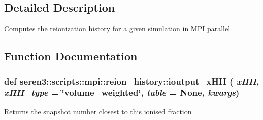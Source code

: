 \subsection{Detailed Description}
\begin{DoxyVerb}
Computes the reionization history for a given simulation in MPI parallel
\end{DoxyVerb}
 

\subsection{Function Documentation}
\hypertarget{namespaceseren3_1_1scripts_1_1mpi_1_1reion__history_a681fd00960f746e906387cdb244f30ac}{
\subsubsection[{ioutput\_\-xHII}]{\setlength{\rightskip}{0pt plus 5cm}def seren3::scripts::mpi::reion\_\-history::ioutput\_\-xHII ( {\em xHII}, \/   {\em xHII\_\-type} = {\ttfamily \char`\"{}volume\_\-weighted\char`\"{}}, \/   {\em table} = {\ttfamily None}, \/   {\em kwargs})}}
\label{namespaceseren3_1_1scripts_1_1mpi_1_1reion__history_a681fd00960f746e906387cdb244f30ac}
\begin{DoxyVerb}
Returns the snapshot number closest to this ionised fraction
\end{DoxyVerb}
 